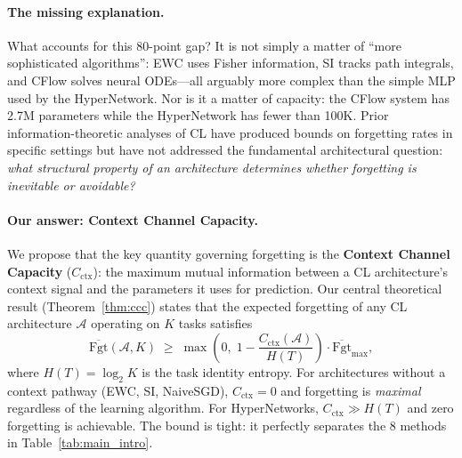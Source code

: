 \documentclass{article}
\begin{document}
\paragraph{The missing explanation.} What accounts for this 80-point gap? It is not simply a matter of ``more sophisticated algorithms'': EWC uses Fisher information, SI tracks path integrals, and CFlow solves neural ODEs---all arguably more complex than the simple MLP used by the HyperNetwork. Nor is it a matter of capacity: the CFlow system has 2.7M parameters while the HyperNetwork has fewer than 100K. Prior information-theoretic analyses of CL \citep{achille2018emergence, doan2021theoretical, taheri2025forgetting} have produced bounds on forgetting rates in specific settings but have not addressed the fundamental architectural question: \emph{what structural property of an architecture determines whether forgetting is inevitable or avoidable?}

\paragraph{Our answer: Context Channel Capacity.} We propose that the key quantity governing forgetting is the \textbf{Context Channel Capacity} ($C_\mathrm{ctx}$): the maximum mutual information between a CL architecture's context signal and the parameters it uses for prediction. Our central theoretical result (Theorem~\ref{thm:ccc}) states that the expected forgetting of any CL architecture $\mathcal{A}$ operating on $K$ tasks satisfies
\begin{equation}
\label{eq:ccc_intro}
    \overline{\mathrm{Fgt}}(\mathcal{A}, K) \;\geq\; \max\!\left(0,\; 1 - \frac{C_\mathrm{ctx}(\mathcal{A})}{H(T)}\right) \cdot \overline{\mathrm{Fgt}}_\mathrm{max},
\end{equation}
where $H(T) = \log_2 K$ is the task identity entropy. For architectures without a context pathway (EWC, SI, NaiveSGD), $C_\mathrm{ctx} = 0$ and forgetting is \emph{maximal} regardless of the learning algorithm. For HyperNetworks, $C_\mathrm{ctx} \gg H(T)$ and zero forgetting is achievable. The bound is tight: it perfectly separates the 8 methods in Table~\ref{tab:main_intro}.
\end{document}
